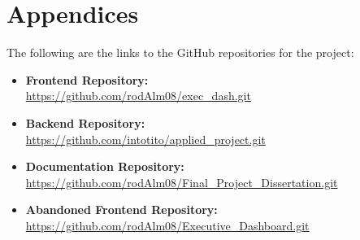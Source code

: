 \chapter{Appendices}

\label{appendix}



\label{sec:github-links}

The following are the links to the GitHub repositories for the project:

\begin{itemize}
    \item \textbf{Frontend Repository:} \\ \url{https://github.com/rodAlm08/exec_dash.git}
    \item \textbf{Backend Repository:} \\ \url{https://github.com/intotito/applied_project.git}
    \item \textbf{Documentation Repository:} \\ \url{https://github.com/rodAlm08/Final_Project_Dissertation.git}
    \item \textbf{Abandoned Frontend Repository:} \\ \url{https://github.com/rodAlm08/Executive_Dashboard.git}
\end{itemize}




\label{sec:ethics-application}




\label{sec:form-recruitment}


